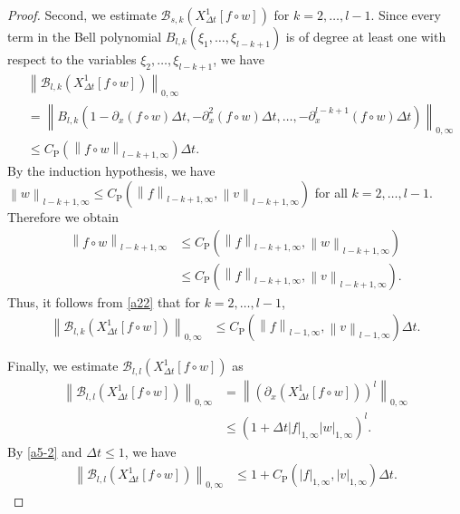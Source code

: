 \documentclass[10pt,a4paper,tbtags,leqno]{amsart}
\theoremstyle{definition}
\numberwithin{equation}{section}
\def\norm#1#2{\left\|#2\right\|_{#1}}
\def\snorm#1#2{\left|#2\right|_{#1}}
\begin{document}
\begin{proof}
  Second, we estimate $ \mathcal{B}_{s, k} ({X_{\Delta t}^1} [ f \circ w]) $ for $ k = 2, \ldots, l - 1 $. Since every term in the Bell polynomial $ B_{l, k} (\xi_1, \ldots, \xi_{l - k + 1}) $ is of degree at least one with respect to the variables $ \xi_2, \ldots, \xi_{l - k + 1} $, we have 
  \begin{align} 
    & \norm{0, \infty}{\mathcal{B}_{l, k}({X_{\Delta t}^1} [f \circ w])} \\ 
    & = \norm{0, \infty}{B_{l, k}(1 - \partial_x (f \circ w) \Delta t, - \partial_x^2 (f \circ w) \Delta t, \ldots, - \partial_x^{l - k + 1} (f \circ w) \Delta t)} \\
    & \leq C_{\mathrm{P}} (\norm{l - k + 1, \infty}{f \circ w}) \Delta t. \label{a22} 
  \end{align} 
  By the induction hypothesis, we have $ \norm{l - k + 1, \infty}{w} \leq C_{\mathrm{P}} (\norm{l - k + 1, \infty}{f}, \norm{l - k + 1, \infty}{v}) $ for all $ k = 2, \ldots, l - 1 $. Therefore we obtain 
  \begin{align} 
    \norm{l - k + 1, \infty}{f \circ w} 
    & \leq C_{\mathrm{P}} (\norm{l - k + 1, \infty}{f}, \norm{l - k + 1, \infty}{w}) \\ 
    & \leq C_{\mathrm{P}} (\norm{l - k + 1, \infty}{f}, \norm{l - k + 1, \infty}{v}). 
  \end{align} 
  Thus, it follows from \eqref{a22} that for $ k = 2, \ldots, l - 1 $, 
  \begin{align} 
    \norm{0, \infty}{\mathcal{B}_{l, k}({X_{\Delta t}^1} [f \circ w])} & \leq C_{\mathrm{P}} (\norm{l - 1, \infty}{f}, \norm{l - 1, \infty}{v}) \Delta t. \label{a18} 
  \end{align} 

  Finally, we estimate $ \mathcal{B}_{l, l} ({X_{\Delta t}^1} [ f \circ w]) $ as 
  \begin{align} 
    \norm{0, \infty}{\mathcal{B}_{l, l} ({X_{\Delta t}^1} [ f \circ w])}& = \norm{0, \infty}{\left(\partial_x ({X_{\Delta t}^1} [ f \circ w])\right)^l} \\ & \leq \left(1 + \Delta t \snorm{1, \infty}{f} \snorm{1, \infty}{w}\right)^l. \label{a17-2} 
  \end{align}
  By \eqref{a5-2} and $ \Delta t \leq 1 $, we have 
  \begin{align}
    \norm{0, \infty}{\mathcal{B}_{l, l} ({X_{\Delta t}^1} [ f \circ w])} & \leq 1 + C_{\mathrm{P}} (\snorm{1, \infty}{f}, \snorm{1, \infty}{v}) \Delta t. \label{a17} 
  \end{align} 


\end{proof}
\end{document}
